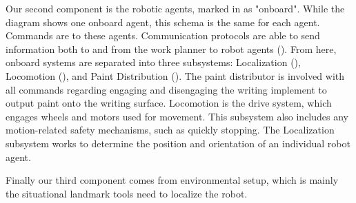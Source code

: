 Our second component is the robotic agents, marked in  as "onboard". While the diagram shows one onboard agent, this schema is the same for each agent. Commands are  to these agents.  Communication protocols are able to send information both to and from the work planner to robot agents (). From here, onboard systems are separated into three subsystems: Localization (), Locomotion (), and Paint Distribution (). The paint distributor is involved with all commands regarding engaging and disengaging the writing implement to output paint onto the writing surface. Locomotion is the drive system, which engages wheels and motors used for movement. This subsystem also includes any motion-related safety mechanisms, such as quickly stopping. The Localization subsystem works to determine the position and orientation of an individual robot agent.

Finally our third component comes from environmental setup, which is mainly the situational landmark tools need to localize the robot.  